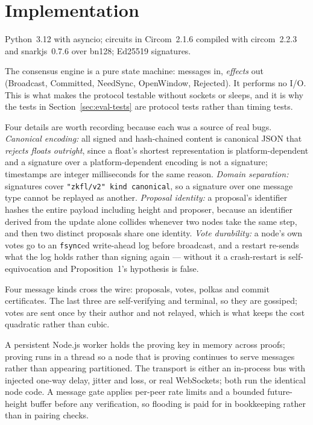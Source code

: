\documentclass{llncs}
\begin{document}
\section{Implementation}

Python~3.12 with asyncio; circuits in Circom~2.1.6 compiled with
circom~2.2.3 and snarkjs~0.7.6 over bn128; Ed25519 signatures.

The consensus engine is a pure state machine: messages in, \emph{effects} out
(\textsf{Broadcast}, \textsf{Committed}, \textsf{NeedSync}, \textsf{OpenWindow},
\textsf{Rejected}). It performs no I/O. This is what makes the protocol testable
without sockets or sleeps, and it is why the tests in
Section~\ref{sec:eval-tests} are protocol tests rather than timing tests.

Four details are worth recording because each was a source of real bugs.
\emph{Canonical encoding:} all signed and hash-chained content is canonical JSON
that \emph{rejects floats outright}, since a float's shortest representation is
platform-dependent and a signature over a platform-dependent encoding is not a
signature; timestamps are integer milliseconds for the same reason.
\emph{Domain separation:} signatures cover
\texttt{"zkfl/v2" \textbar{} kind \textbar{} canonical}, so a signature over one message type
cannot be replayed as another. \emph{Proposal identity:} a proposal's identifier
hashes the entire payload including height and proposer, because an identifier
derived from the update alone collides whenever two nodes take the same step,
and then two distinct proposals share one identity. \emph{Vote durability:} a
node's own votes go to an \texttt{fsync}ed write-ahead log before broadcast, and
a restart re-sends what the log holds rather than signing again --- without it a
crash-restart is self-equivocation and Proposition~1's hypothesis is false.

Four message kinds cross the wire: proposals, votes, polkas and commit
certificates. The last three are self-verifying and terminal, so they are
gossiped; votes are sent once by their author and not relayed, which is what
keeps the cost quadratic rather than cubic.

A persistent Node.js worker holds the proving key in memory across proofs;
proving runs in a thread so a node that is proving continues to serve messages
rather than appearing partitioned. The transport is either an in-process bus
with injected one-way delay, jitter and loss, or real WebSockets; both run the
identical node code. A message gate applies per-peer rate limits and a bounded
future-height buffer before any verification, so flooding is paid for in
bookkeeping rather than in pairing checks.
\end{document}
